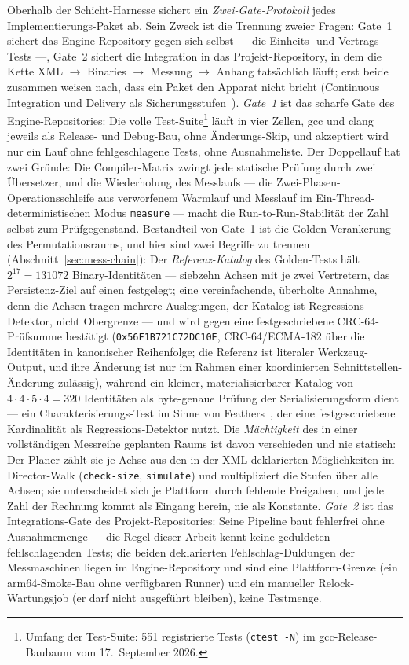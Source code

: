 \begin{nurlang}
Oberhalb der Schicht-Harnesse sichert ein \emph{Zwei-Gate-Protokoll} jedes Implementierungs-Paket ab.
Sein Zweck ist die Trennung zweier Fragen: Gate~1 sichert das Engine-Repository gegen sich selbst --- die
Einheits- und Vertrags-Tests ---, Gate~2 sichert die Integration in das Projekt-Repository, in dem die
Kette XML $\to$ Binaries $\to$ Messung $\to$ Anhang tatsächlich läuft; erst beide zusammen weisen nach, dass ein
Paket den Apparat nicht bricht (Continuous Integration und Delivery als
Sicherungsstufen~\cite{fowler2006ci,humble2010cd}).
\emph{Gate~1} ist das scharfe Gate des Engine-Repositories: Die volle Test-Suite\footnote{Umfang der Test-Suite: 551 registrierte Tests (\texttt{ctest -N}) im
  gcc-Release-Baubaum vom 17.~September 2026.} läuft in vier Zellen, gcc und clang jeweils als
Release- und Debug-Bau, ohne Änderungs-Skip, und akzeptiert wird nur ein Lauf ohne fehlgeschlagene Tests, ohne
Ausnahmeliste. Der Doppellauf hat zwei Gründe: Die Compiler-Matrix zwingt jede statische Prüfung
durch zwei Übersetzer, und die Wiederholung des Messlaufs --- die Zwei-Phasen-Operationsschleife aus
verworfenem Warmlauf und Messlauf im Ein-Thread-deterministischen Modus \texttt{measure} --- macht die
Run-to-Run-Stabilität der Zahl selbst zum Prüfgegenstand. Bestandteil von Gate~1 ist die
Golden-Verankerung des Permutationsraums, und hier sind zwei Begriffe zu trennen
(Abschnitt~\ref{sec:mess-chain}):
Der \emph{Referenz-Katalog} des Golden-Tests hält $2^{17} = 131072$ Binary-Identitäten --- siebzehn Achsen
mit je zwei Vertretern, das Persistenz-Ziel auf einen festgelegt; eine vereinfachende, überholte Annahme, denn
die Achsen tragen mehrere Auslegungen, der Katalog ist Regressions-Detektor, nicht Obergrenze --- und wird gegen eine festgeschriebene
CRC-64-Prüfsumme bestätigt (\texttt{0x56F1B721C72DC10E}, CRC-64/ECMA-182 über die Identitäten in %
kanonischer Reihenfolge; die Referenz ist literaler Werkzeug-Output, und ihre Änderung ist nur im
Rahmen einer koordinierten Schnittstellen-Änderung zulässig), während ein kleiner, materialisierbarer Katalog von
$4\cdot4\cdot5\cdot4 = 320$ Identitäten als byte-genaue Prüfung der Serialisierungsform dient --- ein
Charakterisierungs-Test im Sinne von Feathers~\cite{feathers2004legacy}, der eine festgeschriebene
Kardinalität als Regressions-Detektor nutzt. Die \emph{Mächtigkeit} des in einer vollständigen Messreihe geplanten Raums
ist davon verschieden und nie statisch: Der Planer zählt sie je Achse aus den in der XML deklarierten
Möglichkeiten im Director-Walk (\texttt{check-size}, \texttt{simulate}) und multipliziert die Stufen über
alle Achsen; sie unterscheidet sich je Plattform durch fehlende Freigaben, und jede Zahl der Rechnung
kommt als Eingang herein, nie als Konstante.
\emph{Gate~2} ist das Integrations-Gate des Projekt-Repositories: Seine Pipeline baut fehlerfrei ohne
Ausnahmemenge --- die Regel dieser Arbeit kennt keine geduldeten fehlschlagenden Tests; die beiden deklarierten
Fehlschlag-Duldungen der Messmaschinen liegen im Engine-Repository und sind eine Plattform-Grenze (ein
arm64-Smoke-Bau ohne verfügbaren Runner) und ein manueller Relock-Wartungsjob (er darf nicht ausgeführt
bleiben), keine Testmenge.


\end{nurlang}
